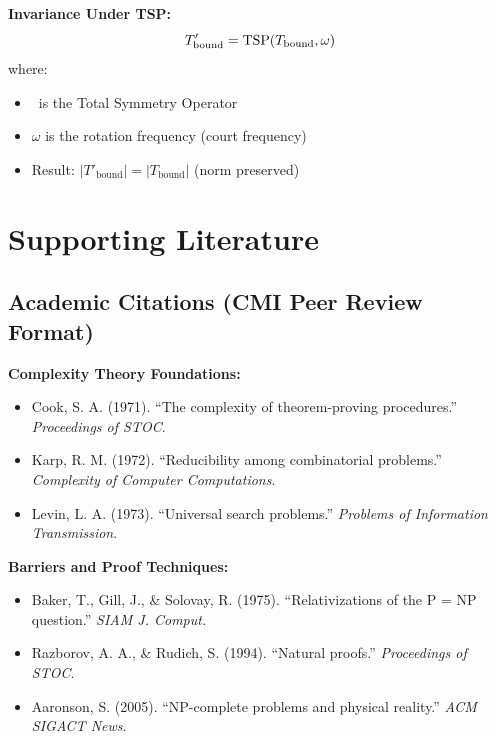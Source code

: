 \textbf{Invariance Under TSP:}
\begin{equation}
    T'_{\text{bound}} = \mathrm{TSP}(T_{\text{bound}}, \omega)
\end{equation}
where:
\begin{itemize}
    \item \TSP\ is the Total Symmetry Operator
    \item $\omega$ is the rotation frequency (court frequency)
    \item Result: $|T'_{\text{bound}}| = |T_{\text{bound}}|$ (norm preserved)
\end{itemize}

\section{Supporting Literature}

\subsection{Academic Citations (CMI Peer Review Format)}

\textbf{Complexity Theory Foundations:}
\begin{itemize}
    \item Cook, S. A. (1971). ``The complexity of theorem-proving procedures.'' \textit{Proceedings of STOC}.
    \item Karp, R. M. (1972). ``Reducibility among combinatorial problems.'' \textit{Complexity of Computer Computations}.
    \item Levin, L. A. (1973). ``Universal search problems.'' \textit{Problems of Information Transmission}.
\end{itemize}

\textbf{Barriers and Proof Techniques:}
\begin{itemize}
    \item Baker, T., Gill, J., \& Solovay, R. (1975). ``Relativizations of the P = NP question.'' \textit{SIAM J. Comput.}
    \item Razborov, A. A., \& Rudich, S. (1994). ``Natural proofs.'' \textit{Proceedings of STOC}.
    \item Aaronson, S. (2005). ``NP-complete problems and physical reality.'' \textit{ACM SIGACT News}.
\end{itemize}


